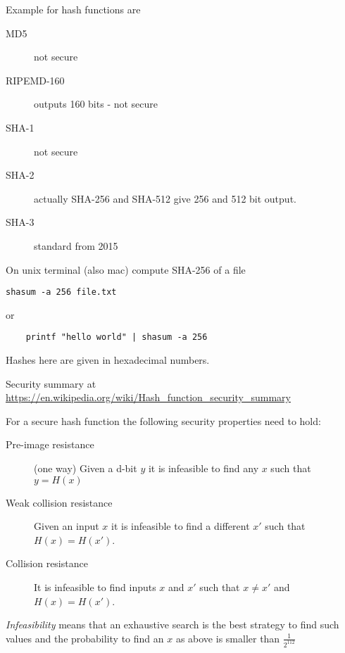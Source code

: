 \begin{example}
Example for hash functions are

\begin{description}
	\item[MD5] not secure
	\item[RIPEMD-160] outputs 160 bits - not secure
	\item[SHA-1] not secure
	\item[SHA-2] actually SHA-256 and SHA-512 give 256 and 512 bit output.
	\item[SHA-3] standard from 2015
\end{description}


On unix terminal (also mac) compute SHA-256 of a file
\begin{verbatim}
shasum -a 256 file.txt	
\end{verbatim}
or
\begin{verbatim}
	printf "hello world" | shasum -a 256
\end{verbatim}
Hashes here are given in hexadecimal numbers.
\end{example}
\noindent
Security summary at\\ \url{https://en.wikipedia.org/wiki/Hash_function_security_summary}






\begin{definition}
	For a secure hash function the following security properties need to hold:
	\begin{description}
		\item[Pre-image resistance] (one way) Given a d-bit $y$ it is infeasible to find any $x$ such that $y= H(x)$
		\item[Weak collision resistance] Given an input $x$ it is infeasible to find a different $x'$ such that $H(x) = H(x')$.
		\item[Collision resistance] It is infeasible to find inputs $x$ and $x'$
		such that $x \neq x'$ and $H(x)=H(x')$.
	\end{description}
	\emph{Infeasibility} means that an exhaustive search is the best strategy to find such values and the probability to find an $x$ as above is smaller than $\frac{1}{2^{112}}$
\end{definition}

